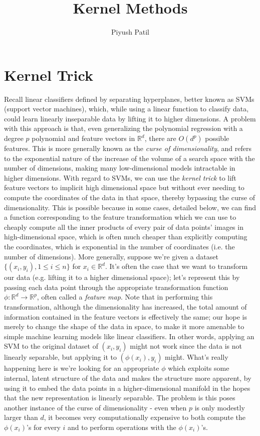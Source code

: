 \documentclass{article}
\begin{document}
\title{Kernel Methods}
\author{Piyush Patil}
\maketitle

\section{Kernel Trick}
Recall linear classifiers defined by separating hyperplanes, better known as SVMs (support vector machines), which, while using a linear function to classify data, could learn linearly inseparable data by lifting it to higher dimensions. A problem with this approach is that, even generalizing the polynomial regression with a degree $ p $ polynomial and feature vectors in $ \mathbb{R}^d $, there are $ O(d^p) $ possible features. This is more generally known as the \textit{curse of dimensionality}, and refers to the exponential nature of the increase of the volume of a search space with the number of dimensions, making many low-dimensional models intractable in higher dimensions.
\newline
With regard to SVMs, we can use the \textit{kernel trick} to lift feature vectors to implicit high dimensional space but without ever needing to compute the coordinates of the data in that space, thereby bypassing the curse of dimensionality. This is possible because in some cases, detailed below, we can find a function corresponding to the feature transformation which we can use to cheaply compute all the inner products of every pair of data points' images in high-dimensional space, which is often much cheaper than explicitly computing the coordinates, which is exponential in the number of coordinates (i.e. the number of dimensions).
\newline \newline
More generally, suppose we're given a dataset $ \{ (x_i, y_i), 1 \leq i \leq n \} $ for $ x_i \in \mathbb{R}^d $. It's often the case that we want to transform our data (e.g. lifting it to a higher dimensional space); let's represent this by passing each data point through the appropriate transformation function $ \phi: \mathbb{R}^d \rightarrow \mathbb{R}^p $, often called a \textit{feature map}. Note that in performing this transformation, although the dimensionality has increased, the total amount of information contained in the feature vectors is effectively the same; our hope is merely to change the shape of the data in space, to make it more amenable to simple machine learning models like linear classifiers. In other words, applying an SVM to the original dataset of $ (x_i, y_i) $ might not work since the data is not linearly separable, but applying it to $ (\phi(x_i), y_i) $ might. What's really happening here is we're looking for an appropriate $ \phi $ which exploits some internal, latent structure of the data and makes the structure more apparent, by using it to embed the data points in a higher-dimensional manifold in the hopes that the new representation is linearly separable. The problem is this poses another instance of the curse of dimensionality - even when $ p $ is only modestly larger than $ d $, it becomes very computationally expensive to both compute the $ \phi(x_i) $'s for every $ i $ and to perform operations with the $ \phi(x_i) $'s.
\end{document}
